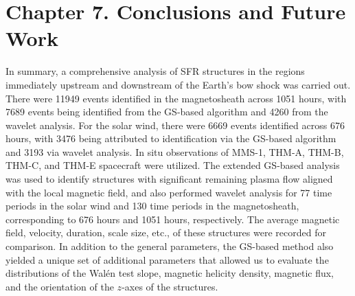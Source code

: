 \chapter{Chapter 7. Conclusions and Future Work}

In summary, a comprehensive analysis of SFR structures in the regions immediately upstream and downstream of the Earth's bow shock was carried out. There were 11949 events identified in the magnetosheath across 1051 hours, with 7689 events being identified from the GS-based algorithm and 4260 from the wavelet analysis. For the solar wind, there were 6669 events identified across 676 hours, with 3476 being attributed to identification via the GS-based algorithm and 3193 via wavelet analysis. In situ observations of MMS-1, THM-A, THM-B, THM-C, and THM-E spacecraft were utilized. The extended GS-based analysis was used to identify structures with significant remaining plasma flow aligned with the local magnetic field, and also performed wavelet analysis for 77 time periods in the solar wind and 130 time periods in the magnetosheath, corresponding to 676 hours and 1051 hours, respectively. The average magnetic field, velocity, duration, scale size, etc., of these structures were recorded for comparison. In addition to the general parameters, the GS-based method also yielded a unique set of additional parameters that allowed us to evaluate the distributions of the Wal\'en test slope, magnetic helicity density, magnetic flux, and the orientation of the $z$-axes of the structures.

